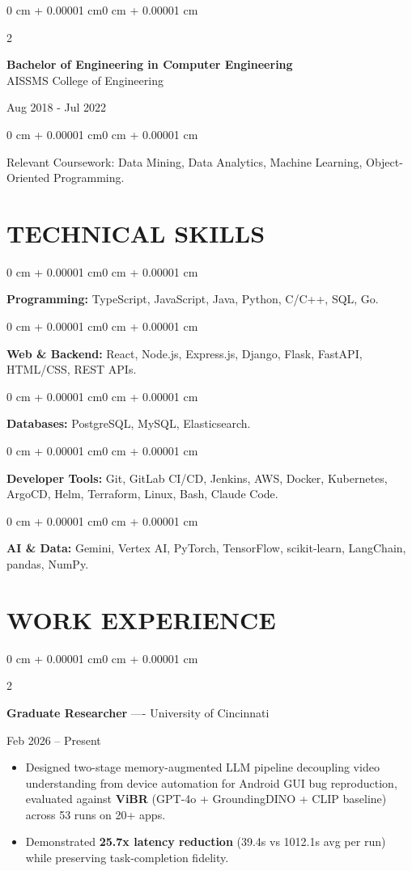 \documentclass[10pt, letterpaper]{article}
\newenvironment{highlights}{
    \begin{itemize}[
        topsep=0.10 cm,
        parsep=0.06 cm,
        partopsep=0pt,
        itemsep=0.06 cm,
        leftmargin=12pt
    ]
}{
    \end{itemize}
}
\newenvironment{onecolentry}{
    \begin{adjustwidth}{0 cm + 0.00001 cm}{0 cm + 0.00001 cm}
}{
    \end{adjustwidth}
}
\newenvironment{twocolentry}[2][]{
    \onecolentry
    \def\secondColumn{#2}
    \setcolumnwidth{\fill, 4.5 cm}
    \begin{paracol}{2}
}{
    \switchcolumn \raggedleft \secondColumn
    \end{paracol}
    \endonecolentry
}
\begin{document}
\begin{twocolentry}{
    Aug 2018 - Jul 2022
}
    \textbf{Bachelor of Engineering in Computer Engineering} \\
    AISSMS College of Engineering
\end{twocolentry}
\begin{onecolentry}
Relevant Coursework: Data Mining, Data Analytics, Machine Learning, Object-Oriented Programming.
\end{onecolentry}
\section{TECHNICAL SKILLS}
\begin{onecolentry}
\textbf{Programming:} TypeScript, JavaScript, Java, Python, C/C++, SQL, Go.
\end{onecolentry}
\vspace{0.06 cm}
\begin{onecolentry}
\textbf{Web \& Backend:} React, Node.js, Express.js, Django, Flask, FastAPI, HTML/CSS, REST APIs.
\end{onecolentry}
\vspace{0.06 cm}
\begin{onecolentry}
\textbf{Databases:} PostgreSQL, MySQL, Elasticsearch.
\end{onecolentry}
\vspace{0.06 cm}
\begin{onecolentry}
\textbf{Developer Tools:} Git, GitLab CI/CD, Jenkins, AWS, Docker, Kubernetes, ArgoCD, Helm, Terraform, Linux, Bash, Claude Code.
\end{onecolentry}
\vspace{0.06 cm}
\begin{onecolentry}
\textbf{AI \& Data:} Gemini, Vertex AI, PyTorch, TensorFlow, scikit-learn, LangChain, pandas, NumPy.
\end{onecolentry}

\section{WORK EXPERIENCE}
\begin{twocolentry}{Feb 2026 -- Present}
\textbf{Graduate Researcher} ---- University of Cincinnati
\end{twocolentry}
\begin{highlights}
  \item Designed two-stage memory-augmented LLM pipeline decoupling video understanding from device automation for Android GUI bug reproduction, evaluated against \textbf{ViBR} (GPT-4o + GroundingDINO + CLIP baseline) across 53 runs on 20+ apps.
  \item Demonstrated \textbf{25.7x latency reduction} (39.4s vs 1012.1s avg per run) while preserving task-completion fidelity.
\end{highlights}
\end{document}
